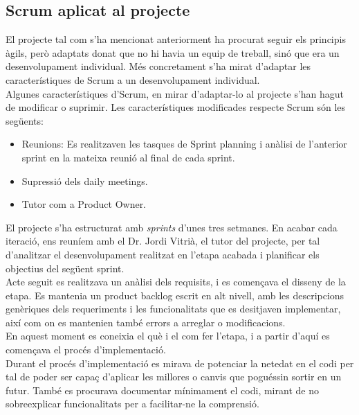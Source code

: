 \documentclass[12pt,a4paper,openright,oneside]{article}
\numberwithin{equation}{section}
\theoremstyle{definition}
\begin{document}
\subsection{Scrum aplicat al projecte}
El projecte tal com s'ha mencionat anteriorment ha procurat seguir els principis àgils, però adaptats donat que no hi havia un equip de treball, sinó que era un desenvolupament individual. Més concretament s'ha mirat d'adaptar les característiques de Scrum a un desenvolupament individual.\\
Algunes característiques d'Scrum, en mirar d'adaptar-lo al projecte s'han hagut de modificar o suprimir. Les característiques modificades respecte Scrum són les següents:
\begin{itemize}
\item Reunions: Es realitzaven les tasques de Sprint planning i anàlisi de l'anterior sprint en la mateixa reunió al final de cada sprint.
\item Supressió dels daily meetings.
\item Tutor com a Product Owner.
\end{itemize}
El projecte s'ha estructurat amb \emph{sprints} d'unes tres setmanes. En acabar cada iteració, ens reuníem amb el Dr. Jordi Vitrià, el tutor del projecte, per tal d'analitzar el desenvolupament realitzat en l'etapa acabada i planificar els objectius del següent sprint.\\
Acte seguit es realitzava un anàlisi dels requisits, i es començava el disseny de la etapa. Es mantenia un product backlog escrit en alt nivell, amb les descripcions genèriques dels requeriments i les funcionalitats que es desitjaven implementar, així com on es mantenien també errors a arreglar o modificacions.\\
En aquest moment es coneixia el què i el com fer l'etapa, i a partir d'aquí es començava el procés d'implementació.\\
Durant el procés d'implementació es mirava de potenciar la netedat en el codi per tal de poder ser capaç d'aplicar les millores o canvis que poguéssin sortir en un futur. També es procurava documentar mínimament el codi, mirant de no sobreexplicar funcionalitats per a facilitar-ne la comprensió.\\
\end{document}
